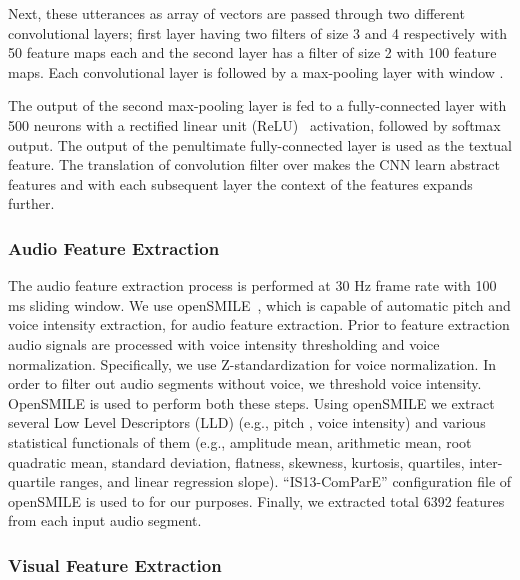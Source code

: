 \documentclass[review]{elsarticle}
\newcommand\?[1]{\hl{#1}}
\begin{document}
Next, these utterances as array of vectors are passed through two different
convolutional layers; first layer having two filters of size 3 and 4
respectively with 50 feature maps each and the second layer has a filter of size
2 with 100 feature maps. Each convolutional layer is followed by a max-pooling
layer with window .

The output of the second max-pooling layer is fed to a fully-connected layer
with 500 neurons with a rectified linear unit (ReLU)~\citep{whyeteh2001rate}
activation, followed by softmax output. The output of the penultimate
fully-connected layer is used as the textual feature. The translation of
convolution filter over makes the CNN learn abstract features and with each
subsequent layer the context of the features expands further.







\subsubsection{Audio Feature Extraction}
\label{audio}

The audio feature extraction process is performed at 30 Hz frame rate with 100
ms sliding window. We use openSMILE~\citep{eyben2010opensmile}, which is capable
of automatic pitch and voice intensity extraction, for audio feature
extraction. Prior to feature extraction audio signals are processed with voice
intensity thresholding and voice normalization. Specifically, we use
Z-standardization for voice normalization. In order to filter out audio segments
without voice, we threshold voice intensity. OpenSMILE is used to perform both
these steps. Using openSMILE we extract several Low Level Descriptors (LLD)
(e.g., pitch , voice intensity) and various statistical functionals of them
(e.g., amplitude mean, arithmetic mean, root quadratic mean, standard deviation,
flatness, skewness, kurtosis, quartiles, inter-quartile ranges, and linear
regression slope). ``IS13-ComParE'' configuration file of openSMILE is used to
for our purposes. Finally, we extracted total 6392 features from each input
audio segment.





\subsubsection{Visual Feature Extraction}
\label{visual}
\end{document}
